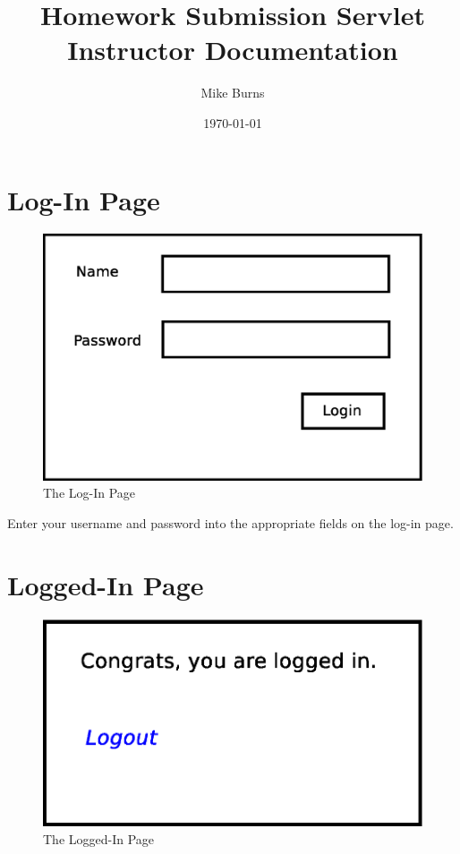 \documentclass{article}
\begin{document}
\title{Homework Submission Servlet Instructor Documentation}
\author{Mike Burns}
\date{\today}

\maketitle

\section{Log-In Page}\label{sec:login}

\begin{figure}[h]
\centering
\includegraphics[scale=.35]{login.eps}
\caption{The Log-In Page}
\label{fig:login}
\end{figure}

Enter your username and password into the appropriate fields on the log-in
page.

\section{Logged-In Page}\label{sec:logged-in}

\begin{figure}[h]
\centering
\includegraphics[scale=.35]{logged-in.eps}
\caption{The Logged-In Page}
\label{fig:logged-in}
\end{figure}
\end{document}
